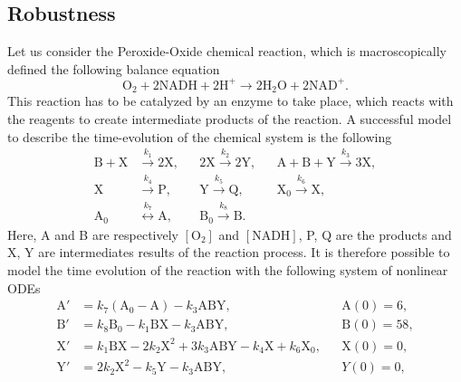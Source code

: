\documentclass{siamart1116}
\numberwithin{theorem}{section}
\newcommand{\rightarrowtext}[1]{\ensuremath{\stackrel{#1}{\longrightarrow}}}
\newcommand{\leftrightarrowtext}[1]{\ensuremath{\stackrel{#1}{\longleftrightarrow}}}
\begin{document}
\subsection{Robustness} Let us consider the Peroxide-Oxide chemical reaction, which is macroscopically defined the following balance equation
\begin{equation}
	\mathrm{O}_2 + 2\mathrm{NADH} + 2\mathrm{H}^+ \to 2\mathrm{H}_2\mathrm{O} + 2\mathrm{NAD}^+.
\end{equation}
This reaction has to be catalyzed by an enzyme to take place, which reacts with the reagents to create intermediate products of the reaction. A successful model \cite{Ols83} to describe the time-evolution of the chemical system is the following
\begin{equation}
\begin{aligned}
	\mathrm{B} + \mathrm{X} &\rightarrowtext{k_1} 2 \mathrm{X}, 
	&&2\mathrm{X} \rightarrowtext{k_2} 2\mathrm{Y}, 
	&&\mathrm{A} + \mathrm{B} + \mathrm{Y} \rightarrowtext{k_3} 3 \mathrm{X}, \\
	\mathrm{X} &\rightarrowtext{k_4} \mathrm{P}, 
	&&\mathrm{Y} \rightarrowtext{k_5} \mathrm{Q}, 
	&&\mathrm{X_0} \rightarrowtext{k_6} \mathrm{X}, \\
	\mathrm{A_0} &\leftrightarrowtext{k_7} \mathrm{A}, 
	&&\mathrm{B_0} \rightarrowtext{k_8} \mathrm{B}.
\end{aligned}
\end{equation}
Here, A and B are respectively $[\mathrm{O}_2]$ and $[\mathrm{NADH}]$, P, Q are the products and X, Y are intermediates results of the reaction process. It is therefore possible to model the time evolution of the reaction with the following system of nonlinear ODEs 
\begin{equation}\label{eq:PeroxOx}
\begin{aligned}
	\mathrm{A}' &= k_7  (\mathrm{A}_0 - \mathrm{A}) - k_3  \mathrm{A}\mathrm{B}\mathrm{Y}, &&\mathrm{A}(0) = 6, \\
	\mathrm{B}' &= k_8\mathrm{B}_0 - k_1  \mathrm{B}\mathrm{X} - k_3  \mathrm{A}\mathrm{B}\mathrm{Y}, &&\mathrm{B}(0) = 58, \\
	\mathrm{X}' &= k_1  \mathrm{B}\mathrm{X} - 2  k_2  \mathrm{X}^2 + 3  k_3 \mathrm{A}\mathrm{B}\mathrm{Y} - k_4  \mathrm{X} + k_6\mathrm{X}_0,&& \mathrm{X}(0) = 0, \\
	\mathrm{Y}' &= 2  k_2  \mathrm{X}^2 - k_5  \mathrm{Y} - k_3  \mathrm{A}\mathrm{B}\mathrm{Y}, && Y(0) = 0,
\end{aligned}
\end{equation}
\end{document}
